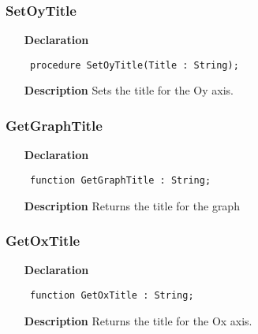 \documentclass[12pt,a4paper,oneside]{report}
\newcommand{\declarationitem}[1]{\textbf{#1}}
\newcommand{\descriptiontitle}[1]{\textbf{#1}}
\newcommand{\code}[1]{\texttt{#1}}
\begin{document}
\subsubsection{SetOyTitle}
\label{uplot-SetOyTitle}
\begin{itemize}\item[\declarationitem{Declaration}\hfill]
	\begin{flushleft}
		\code{
			procedure SetOyTitle(Title : String);}
		
	\end{flushleft}
	
	\par
	\item[\descriptiontitle{Description}]
	Sets the title for the Oy axis.
	
\end{itemize}
\subsubsection{GetGraphTitle}
\label{uplot-GetGraphTitle}
\begin{itemize}\item[\declarationitem{Declaration}\hfill]
	\begin{flushleft}
		\code{
			function GetGraphTitle : String;}
		
	\end{flushleft}
	
	\par
	\item[\descriptiontitle{Description}]
	Returns the title for the graph
	
\end{itemize}
\subsubsection{GetOxTitle}
\label{uplot-GetOxTitle}
\begin{itemize}\item[\declarationitem{Declaration}\hfill]
	\begin{flushleft}
		\code{
			function GetOxTitle : String;}
		
	\end{flushleft}
	
	\par
	\item[\descriptiontitle{Description}]
	Returns the title for the Ox axis.
	
\end{itemize}
\end{document}
